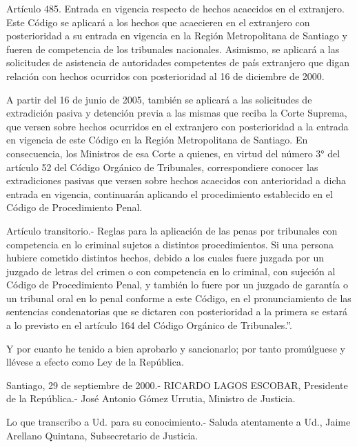     Artículo 485. Entrada en vigencia respecto de hechos acaecidos en el extranjero. Este Código se aplicará a los hechos que acaecieren en el extranjero con posterioridad a su entrada en vigencia en la Región Metropolitana de Santiago y fueren de competencia de los tribunales nacionales. Asimismo, se aplicará a las solicitudes de asistencia de autoridades competentes de país extranjero que digan relación con hechos ocurridos con posterioridad al 16 de diciembre de 2000.

    A partir del 16 de junio de 2005, también se aplicará a las solicitudes de extradición pasiva y detención previa a las mismas que reciba la Corte Suprema, que versen sobre hechos ocurridos en el extranjero con posterioridad a la entrada en vigencia de este Código en la Región Metropolitana de Santiago. En consecuencia, los Ministros de esa Corte a quienes, en virtud del número 3° del artículo 52 del Código Orgánico de Tribunales, correspondiere conocer las extradiciones pasivas que versen sobre hechos acaecidos con anterioridad a dicha entrada en vigencia, continuarán aplicando el procedimiento establecido en el Código de Procedimiento Penal.

    Artículo transitorio.- Reglas para la aplicación de las penas por tribunales con competencia en lo criminal sujetos a distintos procedimientos. Si una persona hubiere cometido distintos hechos, debido a los cuales fuere juzgada por un juzgado de letras del crimen o con competencia en lo criminal, con sujeción al Código de Procedimiento Penal, y también lo fuere por un juzgado de garantía o un tribunal oral en lo penal conforme a este Código, en el pronunciamiento de las sentencias condenatorias que se dictaren con posterioridad a la primera se estará a lo previsto en el artículo 164 del Código Orgánico de Tribunales.''.

    Y por cuanto he tenido a bien aprobarlo y sancionarlo; por tanto promúlguese y llévese a efecto como Ley de la República.

    Santiago, 29 de septiembre de 2000.- RICARDO LAGOS ESCOBAR, Presidente de la República.- José Antonio Gómez Urrutia,  Ministro de Justicia.

    Lo que transcribo a Ud. para su conocimiento.- Saluda atentamente a Ud., Jaime Arellano Quintana, Subsecretario de Justicia.